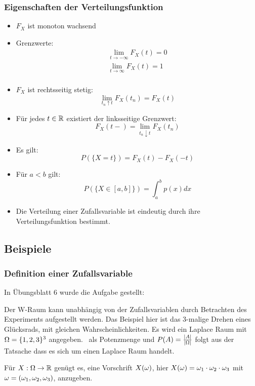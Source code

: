 \subsubsection{Eigenschaften der Verteilungsfunktion}
\begin{itemize}
    \item $F_X$ ist monoton wachsend
    \item Grenzwerte:
          \begin{align*}
              \lim_{t \to -\infty} F_X(t) = 0 \\
              \lim_{t \to \infty} F_X(t) = 1  \\
          \end{align*}
    \item $F_X$ ist rechtsseitig stetig:
          \begin{equation*}
              \lim_{t_n \uparrow t} F_X(t_n) = F_X(t)
          \end{equation*}
    \item Für jedes $t \in \mathbb{R}$ existiert der linksseitige Grenzwert:
          \begin{equation*}
              F_X(t-) = \lim_{t_n \downarrow t} F_X(t_n)
          \end{equation*}
    \item Es gilt:
          \begin{equation*}
              P(\{X=t\}) = F_X(t) - F_X(-t)
          \end{equation*}
    \item Für $a<b$ gilt:
          \begin{equation*}
              P(\{X \in [a,b]\}) = \int_a^b p(x)dx
          \end{equation*}
    \item Die Verteilung einer Zufallsvariable ist eindeutig durch ihre Verteilungsfunktion
          bestimmt.
\end{itemize}

\subsection{Beispiele}
\subsubsection{Definition einer Zufallsvariable}
In Übungsblatt 6 wurde die Aufgabe gestellt:

Der W-Raum kann unabhängig von der Zufallsvariablen durch Betrachten des Experiments
aufgestellt werden.
Das Beispiel hier ist das 3-malige Drehen eines Glücksrads, mit gleichen Wahrscheinlichkeiten.
Es wird ein Laplace Raum mit $\Omega = \{1,2,3\}^3$ angegeben. \tS\ als Potenzmenge und
$P(A) = \frac{|A|}{|\Omega|}$ folgt aus der Tatsache dass es sich um einen Laplace Raum handelt.

Für $X: \Omega \to \mathbb{R}$ genügt es, eine Vorschrift $X(\omega)$, hier
$X(\omega) = \omega_1 \cdot \omega_2 \cdot \omega_3$ mit $\omega = (\omega_1, \omega_2, \omega_3)$, anzugeben.
